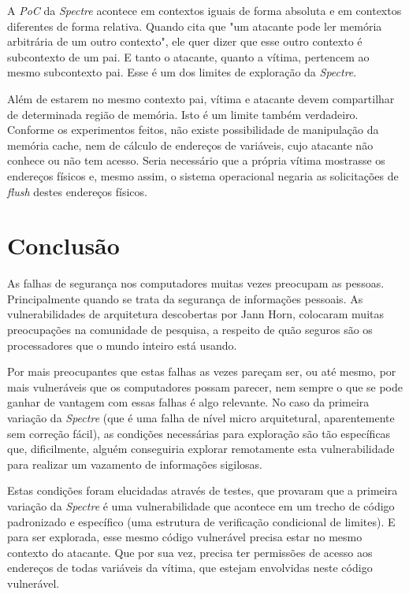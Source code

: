 \documentclass[
	article,			    %
	12pt,				    %
	oneside,			    %
	a4paper,			    %
	chapter=TITLE,		    %
	section=TITLE,		    %
	subsection=TITLE,	    %
	english,			    %
	brazil,				    %
	sumario=tradicional
]{abntex2}
\begin{document}
A \emph{PoC} da \emph{Spectre} acontece em contextos iguais de forma absoluta e em contextos diferentes de forma relativa. Quando  cita que "um atacante pode ler memória arbitrária de um outro contexto", ele quer dizer que esse outro contexto é subcontexto de um pai. E tanto o atacante, quanto a vítima, pertencem ao mesmo subcontexto pai. Esse é um dos limites de exploração da \emph{Spectre}.

Além de estarem no mesmo contexto pai, vítima e atacante devem compartilhar de determinada região de memória. Isto é um limite também verdadeiro. Conforme os experimentos feitos, não existe possibilidade de manipulação da memória cache, nem de cálculo de endereços de variáveis, cujo atacante não conhece ou não tem acesso. Seria necessário que a própria vítima mostrasse os endereços físicos e, mesmo assim, o sistema operacional negaria as solicitações de \emph{flush} destes endereços físicos.

\section{Conclusão}
As falhas de segurança nos computadores muitas vezes preocupam as pessoas. Principalmente quando se trata da segurança de informações pessoais. As vulnerabilidades de arquitetura descobertas por Jann Horn, colocaram muitas preocupações na comunidade de pesquisa, a respeito de quão seguros são os processadores que o mundo inteiro está usando.

Por mais preocupantes que estas falhas as vezes pareçam ser, ou até mesmo, por mais vulneráveis que os computadores possam parecer, nem sempre o que se pode ganhar de vantagem com essas falhas é algo relevante. No caso da primeira variação da \emph{Spectre} (que é uma falha de nível micro arquitetural, aparentemente sem correção fácil), as condições necessárias para exploração são tão específicas que, dificilmente, alguém conseguiria explorar remotamente esta vulnerabilidade para realizar um vazamento de informações sigilosas.

Estas condições foram elucidadas através de testes, que provaram que a primeira variação da \emph{Spectre} é uma vulnerabilidade que acontece em um trecho de código padronizado e específico (uma estrutura de verificação condicional de limites). E para ser explorada, esse mesmo código vulnerável precisa estar no mesmo contexto do atacante. Que por sua vez, precisa ter permissões de acesso aos endereços de todas variáveis da vítima, que estejam envolvidas neste código vulnerável.
\end{document}
